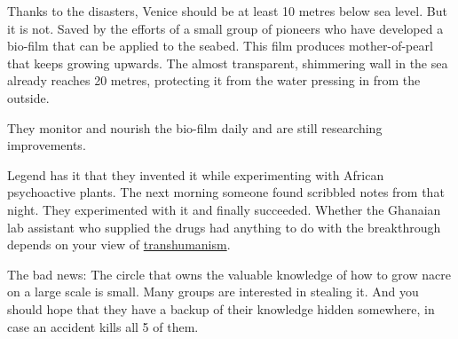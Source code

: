 Thanks to the disasters, Venice should be at least 10 metres below sea level. But it is not. Saved by the efforts of a small group of pioneers who have developed a bio-film that can be applied to the seabed. This film produces mother-of-pearl that keeps growing upwards. The almost transparent, shimmering wall in the sea already reaches 20 metres, protecting it from the water pressing in from the outside.

They monitor and nourish the bio-film daily and are still researching improvements.

Legend has it that they invented it while experimenting with African psychoactive plants. The next morning someone found scribbled notes from that night. They experimented with it and finally succeeded. Whether the Ghanaian lab assistant who supplied the drugs had anything to do with the breakthrough depends on your view of \hyperref[sec:transhumanism]{transhumanism}.

The bad news: The circle that owns the valuable knowledge of how to grow nacre on a large scale is small. Many groups are interested in stealing it. And you should hope that they have a backup of their knowledge hidden somewhere, in case an accident kills all 5 of them.






